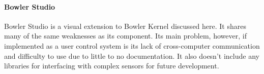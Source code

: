 \paragraph*{Bowler Studio}
Bowler Studio is a visual extension to Bowler Kernel discussed here. It shares many of the same weaknesses as its component. Its main problem, however, if implemented as a user control system is its lack of cross-computer communication and difficulty to use due to little to no documentation. It also doesn't include any libraries for interfacing with complex sensors for future development.





